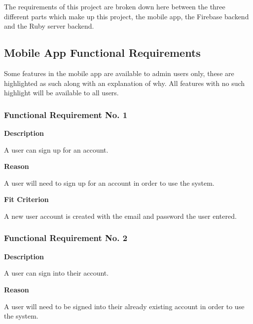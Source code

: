 

The requirements of this project are broken down here between the three different parts which make up this project, the mobile app, the Firebase backend and the Ruby server backend.

\subsection{Mobile App Functional Requirements}

Some features in the mobile app are available to admin users only, these are highlighted as such along with an explanation of why. All features with no such highlight will be available to all users.

\subsubsection{Functional Requirement No. 1}

\textbf{Description}

A user can sign up for an account.

\textbf{Reason}

A user will need to sign up for an account in order to use the system.

\textbf{Fit Criterion}

A new user account is created with the email and password the user entered.

\subsubsection{Functional Requirement No. 2}

\textbf{Description}

A user can sign into their account.

\textbf{Reason}

A user will need to be signed into their already existing account in order to use the system.


